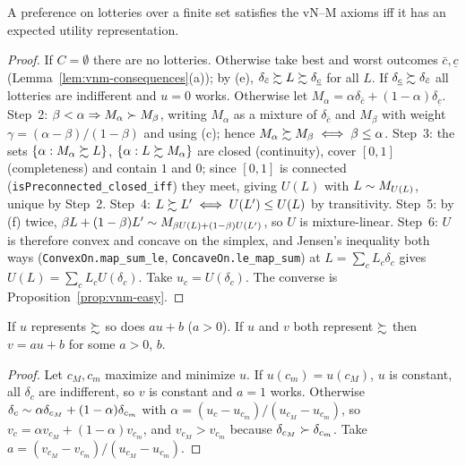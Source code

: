 \begin{theorem}
\label{thm:vnm}
\leanok
{}
A preference on lotteries over a finite set satisfies the vN--M axioms iff it has an expected
utility representation.
\end{theorem}
\begin{proof}
\leanok
If $C = \emptyset$ there are no lotteries. Otherwise take best and worst outcomes $\bar c, \underline c$
(Lemma~\ref{lem:vnm-consequences}(a)); by (e), $\delta_{\bar c} \succsim L \succsim \delta_{\underline c}$
for all $L$. If $\delta_{\underline c} \succsim \delta_{\bar c}$ all lotteries are indifferent and $u = 0$
works. Otherwise let $M_\alpha = \alpha\delta_{\bar c} + (1-\alpha)\delta_{\underline c}$.
Step~2: $\beta < \alpha \Rightarrow M_\alpha \succ M_\beta$, writing $M_\alpha$ as a mixture of
$\delta_{\bar c}$ and $M_\beta$ with weight $\gamma = (\alpha-\beta)/(1-\beta)$ and using (c); hence
$M_\alpha \succsim M_\beta \iff \beta \le \alpha$. Step~3: the sets
$\{\alpha : M_\alpha \succsim L\}$, $\{\alpha : L \succsim M_\alpha\}$ are closed (continuity), cover $[0,1]$
(completeness) and contain $1$ and $0$; since $[0,1]$ is connected (\texttt{isPreconnected\_closed\_iff})
they meet, giving $U(L)$ with $L \sim M_{U(L)}$, unique by Step~2. Step~4: $L \succsim L' \iff
U(L') \le U(L)$ by transitivity. Step~5: by (f) twice, $\beta L + (1-\beta)L' \sim
M_{\beta U(L) + (1-\beta)U(L')}$, so $U$ is mixture-linear. Step~6: $U$ is therefore convex and
concave on the simplex, and Jensen's inequality both ways (\texttt{ConvexOn.map\_sum\_le},
\texttt{ConcaveOn.le\_map\_sum}) at $L = \sum_c L_c\delta_c$ gives $U(L) = \sum_c L_c U(\delta_c)$.
Take $u_c = U(\delta_c)$. The converse is Proposition~\ref{prop:vnm-easy}.
\end{proof}

\begin{theorem}
\label{thm:vnm-unique}
\leanok
{}
If $u$ represents $\succsim$ so does $a u + b$ ($a > 0$). If $u$ and $v$ both represent $\succsim$ then
$v = a u + b$ for some $a > 0$, $b$.
\end{theorem}
\begin{proof}
\leanok
Let $c_M, c_m$ maximize and minimize $u$. If $u(c_m) = u(c_M)$, $u$ is constant, all $\delta_c$ are
indifferent, so $v$ is constant and $a = 1$ works. Otherwise $\delta_c \sim \alpha\delta_{c_M} +
(1-\alpha)\delta_{c_m}$ with $\alpha = (u_c - u_{c_m})/(u_{c_M}-u_{c_m})$, so $v_c = \alpha v_{c_M} +
(1-\alpha) v_{c_m}$, and $v_{c_M} > v_{c_m}$ because $\delta_{c_M}\succ\delta_{c_m}$. Take
$a = (v_{c_M}-v_{c_m})/(u_{c_M}-u_{c_m})$.
\end{proof}

